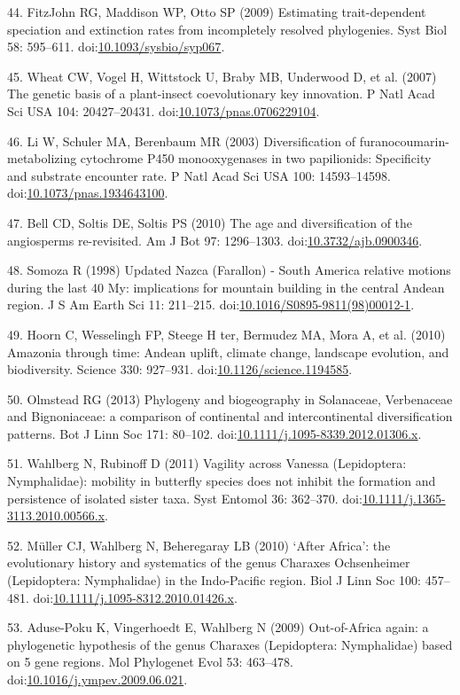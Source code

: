 \documentclass[]{article}
\begin{document}
44. {FitzJohn} RG, Maddison WP, Otto SP (2009) Estimating
trait-dependent speciation and extinction rates from incompletely
resolved phylogenies. Syst Biol 58: 595--611.
doi:\href{http://dx.doi.org/10.1093/sysbio/syp067}{10.1093/sysbio/syp067}.

45. Wheat CW, Vogel H, Wittstock U, Braby MB, Underwood D, et al. (2007)
The genetic basis of a plant-insect coevolutionary key innovation. P
Natl Acad Sci USA 104: 20427--20431.
doi:\href{http://dx.doi.org/10.1073/pnas.0706229104}{10.1073/pnas.0706229104}.

46. Li W, Schuler MA, Berenbaum MR (2003) Diversification of
furanocoumarin-metabolizing cytochrome P450 monooxygenases in two
papilionids: Specificity and substrate encounter rate. P Natl Acad Sci
USA 100: 14593--14598.
doi:\href{http://dx.doi.org/10.1073/pnas.1934643100}{10.1073/pnas.1934643100}.

47. Bell CD, Soltis DE, Soltis PS (2010) The age and diversification of
the angiosperms re-revisited. Am J Bot 97: 1296--1303.
doi:\href{http://dx.doi.org/10.3732/ajb.0900346}{10.3732/ajb.0900346}.

48. Somoza R (1998) Updated Nazca (Farallon) - South America relative
motions during the last 40 My: implications for mountain building in the
central Andean region. J S Am Earth Sci 11: 211--215.
doi:\href{http://dx.doi.org/10.1016/S0895-9811(98)00012-1}{10.1016/S0895-9811(98)00012-1}.

49. Hoorn C, Wesselingh FP, Steege H ter, Bermudez MA, Mora A, et al.
(2010) Amazonia through time: Andean uplift, climate change, landscape
evolution, and biodiversity. Science 330: 927--931.
doi:\href{http://dx.doi.org/10.1126/science.1194585}{10.1126/science.1194585}.

50. Olmstead RG (2013) Phylogeny and biogeography in Solanaceae,
Verbenaceae and Bignoniaceae: a comparison of continental and
intercontinental diversification patterns. Bot J Linn Soc 171: 80--102.
doi:\href{http://dx.doi.org/10.1111/j.1095-8339.2012.01306.x}{10.1111/j.1095-8339.2012.01306.x}.

51. Wahlberg N, Rubinoff D (2011) Vagility across Vanessa (Lepidoptera:
Nymphalidae): mobility in butterfly species does not inhibit the
formation and persistence of isolated sister taxa. Syst Entomol 36:
362--370.
doi:\href{http://dx.doi.org/10.1111/j.1365-3113.2010.00566.x}{10.1111/j.1365-3113.2010.00566.x}.

52. Müller CJ, Wahlberg N, Beheregaray LB (2010) `After Africa': the
evolutionary history and systematics of the genus Charaxes Ochsenheimer
(Lepidoptera: Nymphalidae) in the Indo-Pacific region. Biol J Linn Soc
100: 457--481.
doi:\href{http://dx.doi.org/10.1111/j.1095-8312.2010.01426.x}{10.1111/j.1095-8312.2010.01426.x}.

53. Aduse-Poku K, Vingerhoedt E, Wahlberg N (2009) Out-of-Africa again:
a phylogenetic hypothesis of the genus Charaxes (Lepidoptera:
Nymphalidae) based on 5 gene regions. Mol Phylogenet Evol 53: 463--478.
doi:\href{http://dx.doi.org/10.1016/j.ympev.2009.06.021}{10.1016/j.ympev.2009.06.021}.
\end{document}
